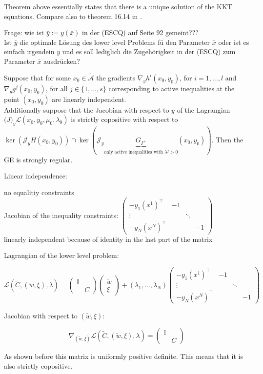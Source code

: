 Theorem above essentially states that there is a unique solution of the KKT equations.
Compare also to theorem 16.14 in \cite{Ulbrich2012}.

Frage: wie ist \(\bar{y}:=y(\bar{x})\) in der (ESCQ) auf Seite 92 gemeint???\\
Ist \(\bar{y}\) die optimale L\"osung des lower level Problems f\"u den Parameter \(\bar{x}\) oder ist es einfach irgendein \(y\) und es soll lediglich die Zugeh\"origkeit in der (ESCQ) zum Parameter \(\bar{x}\) ausdr\"ucken?

\begin{theorem}
	Suppose that for some \(x_0 \in \tilde{\mathcal{A}}\) the gradients \(\nabla_y h^i(x_0,y_0)\), for \(i = 1,...,l\) and \(\nabla_y g^j(x_0,y_0)\), for all \(j \in \{1,...,s\}\) corresponding to active inequalities at the point \((x_0,y_0)\) are linearly independent.\\
	Additionally suppose that the Jacobian with respect to \(y\) of the Lagrangian \(\mathcal(J)_y\mathcal{L}(x_0,y_0,\mu_0,\lambda_0)\) is strictly copositive with respect to \(\ker(\mathcal{J}_y H(x_0,y_0))\cap\ker(\mathcal{J}_y\underbrace{G_{I^+}}_{\text{only active inequalities with } \lambda^j > 0}(x_0,y_0))\).
	Then the GE is strongly regular.
\end{theorem}

Linear independence:

no equalitiy constraints \\
Jacobian of the inequality constraints: \(\begin{pmatrix}-y_1(x^1)^{\top} & -1 \\
		\vdots & & \ddots \\ -y_N(x^N)^{\top} & & & -1\end{pmatrix}\) \\
		linearly independent because of identity in the last part of the matrix

Lagrangian of the lower level problem:

\[ \mathcal{L}(\tilde{C},(\tilde{w},\xi),\lambda) = \begin{pmatrix} \mathbb{I}\\ & C \end{pmatrix} \begin{pmatrix}	\tilde{w}\\ \xi \end{pmatrix} + (\lambda_1,...,\lambda_N)\begin{pmatrix}-y_1(x^1)^{\top} & -1 \\
		\vdots & & \ddots \\ -y_N(x^N)^{\top} & & & -1\end{pmatrix} \]

Jacobian with respect to \((\tilde{w},\xi)\):

\[ \nabla_{(\tilde{w},\xi)}\mathcal{L}(\tilde{C},(\tilde{w},\xi),\lambda) = \begin{pmatrix} \mathbb{I}\\ & C \end{pmatrix} \]

As shown before this matrix is uniformly positive definite. This means that it is also strictly copositive.








